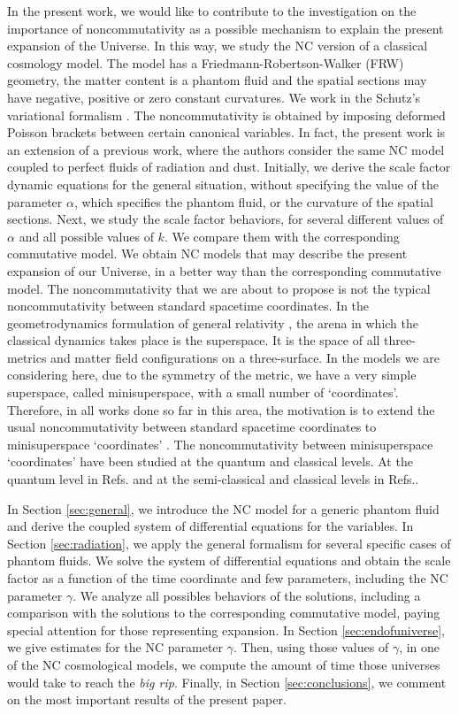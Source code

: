 \documentclass[12pt]{article}
\newcommand{\0}{{(0)}}
\newcommand{\1}{{(1)}}
\newcommand{\2}{{(2)}}
\begin{document}
In the present work, we would like to contribute to the investigation on the importance of 
noncommutativity as a possible mechanism to explain the present expansion of the Universe. 
In this way, we study the NC version of a classical
cosmology model. The model has a Friedmann-Robertson-Walker (FRW) geometry, the 
matter content is a phantom fluid and the spatial sections may have 
negative, positive or zero constant curvatures. We work in the Schutz's variational 
formalism \cite{schutz,germano1}. The noncommutativity is
obtained by imposing deformed Poisson brackets between certain canonical variables. 
In fact, the present work is an extension of a previous work\cite{gil2}, where the authors
consider the same NC model coupled to perfect fluids of radiation and dust.
Initially, we derive the scale factor dynamic equations for the general situation, without 
specifying the value of the parameter $\alpha$, which specifies the phantom fluid, or the 
curvature of the spatial sections. Next, we study the scale factor behaviors, for several different
values of $\alpha$ and all possible values of $k$. We compare them with the corresponding 
commutative model. We obtain NC models that may describe the present expansion of our Universe, 
in a better way than the corresponding commutative model. The noncommutativity that we are about to 
propose is not the typical noncommutativity between standard spacetime coordinates. 
In the geometrodynamics formulation of general relativity \cite{wheeler},
the arena in which the classical dynamics takes place is the superspace. 
It is the space of all three-metrics and matter field configurations on a three-surface. In the 
models we are considering here, due to the symmetry of the metric, we have a very simple superspace, 
called minisuperspace, with a small number of `coordinates'. Therefore, in all works done so far in this 
area, the motivation is to extend the usual noncommutativity between standard spacetime coordinates 
to minisuperspace `coordinates' \cite{garcia}. The noncommutativity between minisuperspace
`coordinates' have been studied at the quantum and classical levels. At the quantum
level in Refs.\cite{garcia,nelson,barbosa,gil1} and at the semi-classical and classical levels in
Refs.\cite{pedram,obregon,gil,gil2}. 

In Section \ref{sec:general}, we introduce the NC model for a generic
phantom fluid and derive the coupled system of differential equations for the variables. In
Section \ref{sec:radiation}, we apply the general formalism for several specific cases of phantom
fluids. We solve the system of differential equations and obtain the scale factor as a function
of the time coordinate and few parameters, including the NC parameter $\gamma$. We analyze all
possibles behaviors of the solutions, including a comparison with the solutions to the corresponding 
commutative model, paying special attention for those representing expansion. In Section \ref{sec:endofuniverse},
we give estimates for the NC parameter $\gamma$. Then, using those values of $\gamma$, in one of the
NC cosmological models, we compute the amount of time those universes would take to reach the {\it big rip}.
Finally, in Section \ref{sec:conclusions}, we comment on the most important results of the present paper.
\end{document}
